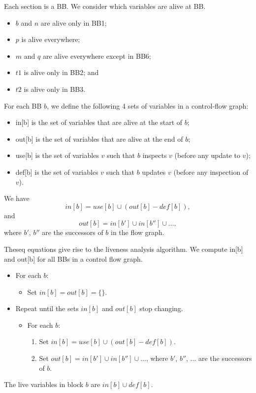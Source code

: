 \documentclass[a4paper, openany]{memoir}
\begin{document}
Each section is a BB. We consider which variables are alive at BB.
\begin{itemize}
    \item $b$ and $n$ are alive only in BB1;
    \item $p$ is alive everywhere;
    \item $m$ and $q$ are alive everywhere except in BB6;
    \item $t1$ is alive only in BB2; and
    \item $t2$ is alive only in BB3.
\end{itemize}

For each BB $b$, we define the following 4 sets of variables in a control-flow graph:
\begin{itemize}
    \item in[b] is the set of variables that are alive at the start of $b$;
    \item out[b] is the set of variables that are alive at the end of $b$;
    \item use[b] is the set of variables $v$ such that $b$ inspects $v$ (before any update to $v$);
    \item def[b] is the set of variables $v$ such that $b$ updates $v$ (before any inspection of $v$).
\end{itemize}
We have
\[in[b] = use[b] \cup (out[b] - def[b]),\]
and
\[out[b] = in[b'] \cup in[b''] \cup \dots,\]
where $b'$, $b''$ are the successors of $b$ in the flow graph.

Theseq equations give rise to the liveness analysis algorithm. We compute in[b] and out[b] for all BBs in a control flow graph.
\begin{itemize}
    \item For each $b$:
    \begin{itemize}
        \item Set $in[b] = out[b] = \{\}$.
    \end{itemize}
    \item Repeat until the sets $in[b]$ and $out[b]$ stop changing.
    \begin{itemize}
        \item For each $b$:
        \begin{enumerate}
            \item Set $in[b] = use[b] \cup (out[b] - def[b])$.
            \item Set $out[b] = in[b'] \cup in[b''] \cup \dots$, where $b'$, $b''$, $\dots$ are the successors of $b$.
        \end{enumerate}
    \end{itemize}
\end{itemize}
The live variables in block $b$ are $in[b] \cup def[b]$.
\end{document}
